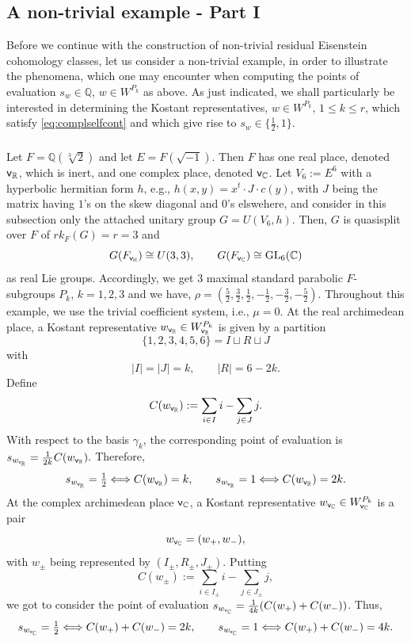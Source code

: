 \documentclass[a4paper,10pt]{amsart}
\theoremstyle{definition}
\numberwithin{equation}{section}
\def\R{\mathbb R}
\def\Q{\mathbb Q}
\def\C{\mathbb C}
\def\GL{{\rm GL}}
\def\vv{{\sf v}} %
\begin{document}
\subsection{A non-trivial example - Part I}
Before we continue with the construction of non-trivial residual Eisenstein cohomology classes, let us consider a non-trivial example, in order to illustrate the phenomena, which one may encounter when computing the points of evaluation $s_w\in\Q$, $w\in W^{P_k}$ as above. As just indicated, we shall particularly be interested in determining the Kostant representatives, $w\in W^{P_k}$, $1\leq k\leq r$, which satisfy \eqref{eq:complselfcont} and which give rise to $s_w\in\{\tfrac12,1\}$.


\subsubsection{}\label{sect:extex}
Let $F=\Q(\sqrt[3]{2})$ and let $E=F(\sqrt{-1})$. Then \(F\) has one real place, denoted $\vv_\R$, which is inert, and one complex place, denoted $\vv_\C$. Let \(V_6:=E^6\) with a hyperbolic hermitian form $h$, e.g., $h(x,y)=x^t\cdot J\cdot c(y)$, with $J$ being the matrix having $1$'s on the skew diagonal and $0$'s elswehere, and consider in this subsection only the attached unitary group $G=U(V_6,h)$. Then, $G$ is quasisplit over $F$ of $rk_F(G)=r=3$ and
$$
G(F_{\vv_{\R}})\cong U(3,3),
\qquad
G(F_{\vv_{\C}})\cong \GL_6(\C)
$$
as real Lie groups. Accordingly, we get $3$ maximal standard parabolic $F$-subgroups \(P_k\), \(k=1,2,3\) and we have, $\rho
=
\left(\frac52,\frac32,\frac12,-\frac12,-\frac32,-\frac52\right).$
Throughout this example, we use the trivial coefficient system, i.e., $\mu=0$. At the real archimedean place, a Kostant representative $w_{\vv_\R}\in W^{P_k}_{\vv_\R}$ is given by a partition
$$
\{1,2,3,4,5,6\}=I\sqcup R\sqcup J
$$
with
$$
|I|=|J|=k,\qquad |R|=6-2k.
$$
Define
$$
C(w_{\vv_\R}):=\sum_{i\in I} i-\sum_{j\in J} j.
$$
With respect to the basis \(\gamma_k\), the corresponding point of evaluation is $s_{w_{\vv_\R}}=\frac{1}{2k} C(w_{\vv_\R}).$ Therefore,
$$
s_{w_{\vv_\R}}=\tfrac12 \Longleftrightarrow C(w_{\vv_\R})=k,
\qquad
s_{w_{\vv_\R}}=1 \Longleftrightarrow C(w_{\vv_\R})=2k.
$$
At the complex archimedean place $\vv_\C$, a Kostant representative $w_{\vv_\C}\in W^{P_k}_{\vv_\C}$ is a pair
$$
w_{\vv_\C}=(w_+,w_-),
$$
with $w_\pm$ being represented by $(I_\pm,R_\pm,J_\pm)$. Putting
$$
C(w_\pm):=\sum_{i\in I_\pm}i-\sum_{j\in J_\pm}j, 
$$
we got to consider the point of evaluation $s_{w_{\vv_\C}}=\frac{1}{4k} (C(w_+)+C(w_-))$. Thus,
$$
s_{w_{\vv_\C}}=\tfrac12 \Longleftrightarrow C(w_+)+C(w_-)=2k,
\qquad
s_{w_{\vv_\C}}=1 \Longleftrightarrow C(w_+)+C(w_-)=4k.
$$
\end{document}
